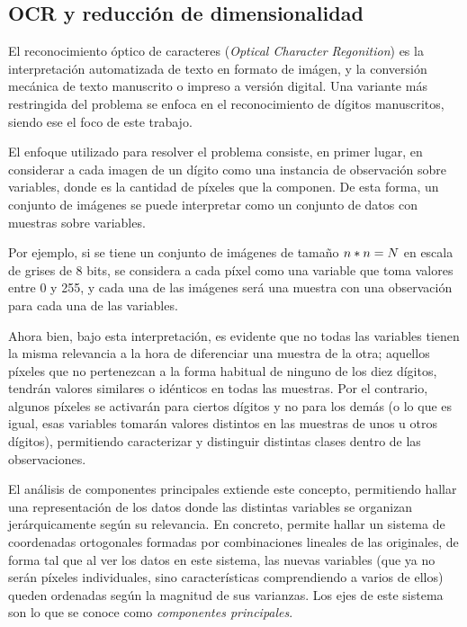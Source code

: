 \subsection{OCR y reducción de dimensionalidad}

El reconocimiento óptico de caracteres (\emph{Optical Character Regonition}) es la interpretación automatizada de texto en formato de imágen, y la conversión mecánica de texto manuscrito o impreso a versión digital. Una variante más restringida del problema se enfoca en el reconocimiento de dígitos manuscritos, siendo ese el foco de este trabajo.

El enfoque utilizado para resolver el problema consiste, en primer lugar, en considerar a cada imagen de un dígito como una instancia de observación sobre \N variables, donde \N es la cantidad de píxeles que la componen. De esta forma, un conjunto de \M imágenes se puede interpretar como un conjunto de datos con \M muestras sobre \N variables.

Por ejemplo, si se tiene un conjunto de imágenes de tamaño $n * n = N$ en escala de grises de 8 bits, se considera a cada píxel como una variable que toma valores entre 0 y 255, y cada una de las imágenes será una muestra con una observación para cada una de las \N variables.

Ahora bien, bajo esta interpretación, es evidente que no todas las variables tienen la misma relevancia a la hora de diferenciar una muestra de la otra; aquellos píxeles que no pertenezcan a la forma habitual de ninguno de los diez dígitos, tendrán valores similares o idénticos en todas las muestras. Por el contrario, algunos píxeles se activarán para ciertos dígitos y no para los demás (o lo que es igual, esas variables tomarán valores distintos en las muestras de unos u otros  dígitos), permitiendo caracterizar y distinguir distintas clases dentro de las observaciones.

El análisis de componentes principales extiende este concepto, permitiendo hallar una representación de los datos donde las distintas variables se organizan jerárquicamente según su relevancia. En concreto, permite hallar un sistema de coordenadas ortogonales formadas por combinaciones lineales de las originales, de forma tal que al ver los datos en este sistema, las nuevas variables (que ya no serán píxeles individuales, sino características comprendiendo a varios de ellos) queden ordenadas según la magnitud de sus varianzas. Los ejes de este sistema son lo que se conoce como \emph{componentes principales}.


